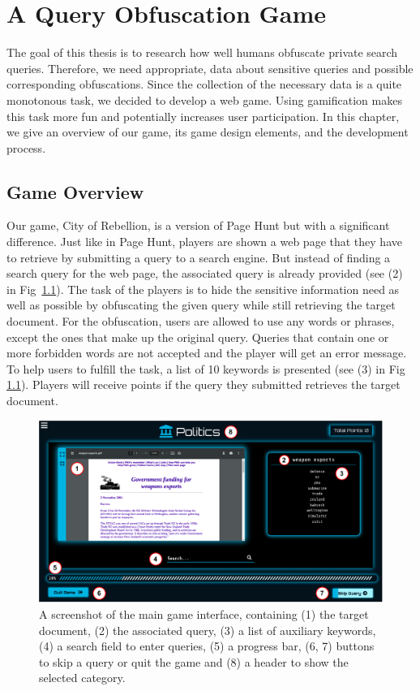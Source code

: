 \chapter{A Query Obfuscation Game}
The goal of this thesis is to research how well humans obfuscate private search queries. Therefore, we need appropriate, data about sensitive queries and possible corresponding obfuscations. Since the collection of the necessary data is a quite monotonous task, we decided to develop a web game. Using gamification makes this task more fun and potentially increases user participation. In this chapter, we give an overview of our game, its game design elements, and the development process.

\section{Game Overview}
\label{overview}
Our game, City of Rebellion, is a version of Page Hunt but with a significant difference. Just like in Page Hunt, players are shown a web page that they have to retrieve by submitting a query to a search engine. But instead of finding a search query for the web page, the associated query is already provided (see (2) in Fig~\ref{fig:game_interface}). The task of the players is to hide the sensitive information need as well as possible by obfuscating the given query while still retrieving the target document.
For the obfuscation, users are allowed to use any words or phrases, except the ones that make up the original query. Queries that contain one or more forbidden words are not accepted and the player will get an error message.
To help users to fulfill the task, a list of 10 keywords is presented (see (3) in Fig \ref{fig:game_interface}). Players will receive points if the query they submitted retrieves the target document.\par
\begin{figure}[h]
    \includegraphics[width=1.0\textwidth]{graphics/game/game_description_all_elements.pdf}
    \caption{A screenshot of the main game interface, containing (1) the target document, (2) the associated query, (3) a list of auxiliary keywords, (4) a search field to enter queries, (5) a progress bar, (6, 7) buttons to skip a query or quit the game and (8) a header to show the selected category.}
    \label{fig:game_interface}
\end{figure}
